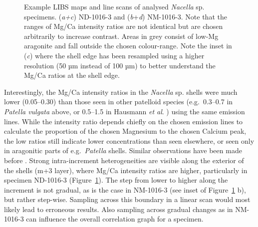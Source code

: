 \documentclass[
  authoryear,
  preprint,
  3p]{elsarticle}
\begin{document}
\begin{figure}[H]


\caption{\label{fig-Nac_LIBS}Example LIBS maps and line scans of
analysed \emph{Nacella} sp. specimens. (\emph{a+c}) ND-1016-3 and
(\emph{b}+\emph{d}) NM-1016-3. Note that the ranges of Mg/Ca intensity
ratios are not identical but are chosen arbitrarily to increase
contrast. Areas in grey consist of low-Mg aragonite and fall outside the
chosen colour-range. Note the inset in (\emph{c}) where the shell edge
has been resampled using a higher resolution (50 µm instead of 100 µm)
to better understand the Mg/Ca ratios at the shell edge.}

\end{figure}%

Interestingly, the Mg/Ca intensity ratios in the \emph{Nacella} sp.
shells were much lower (0.05--0.30) than those seen in other patelloid
species (e.g.~0.3--0.7 in \emph{Patella vulgata} above, or 0.5--1.5 in
Hausmann \emph{et al}. \citeyearpar{Hausmann2023-ih}) using the same
emission lines. While the intensity ratio depends chiefly on the chosen
emission lines to calculate the proportion of the chosen Magnesium to
the chosen Calcium peak, the low ratios still indicate lower
concentrations than seen elsewhere, or seen only in aragonitic parts of
e.g.~\emph{Patella} shells. Similar observations have been made before
\citep{Graniero2017-io}. Strong intra-increment heterogeneities are
visible along the exterior of the shells (m+3 layer), where Mg/Ca
intensity ratios are higher, particularly in specimen ND-1016-3
(Figure~\ref{fig-Nac_LIBS}). The step from lower to higher along the
increment is not gradual, as is the case in NM-1016-3 (see inset of
Figure~\ref{fig-Nac_LIBS} b), but rather step-wise. Sampling across this
boundary in a linear scan would most likely lead to erroneous results.
Also sampling across gradual changes as in NM-1016-3 can influence the
overall correlation graph for a specimen.
\end{document}
